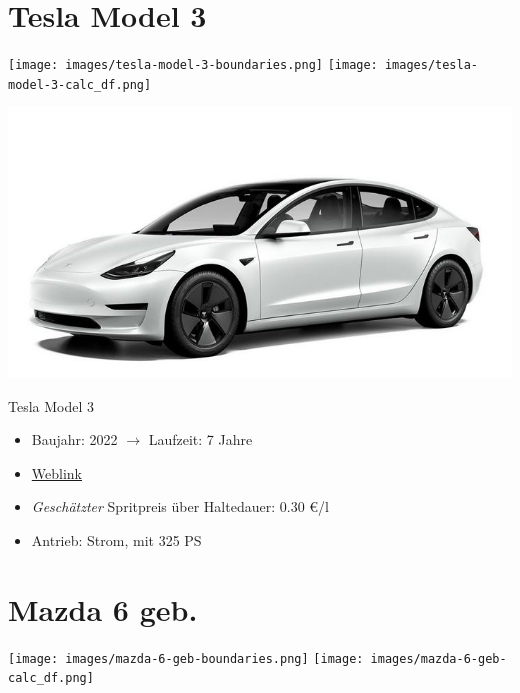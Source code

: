 \documentclass[landscape, DIV=99, 14pt]{scrartcl}
\begin{document}
\pagebreak


\twocolumn

\section*{Tesla Model 3}
\begin{center}
\texttt{[image: images/tesla-model-3-boundaries.png]}
\null
\vspace{0.5cm}
\texttt{[image: images/tesla-model-3-calc\_df.png]}
\end{center}

\pagebreak
\null
\vspace{2cm}
\begin{center}
\includegraphics[width=0.9\columnwidth]{cars/tesla-model-3.jpg}

Tesla Model 3
\end{center}

\begin{itemize}
    \item Baujahr: 2022 $\rightarrow$ Laufzeit: 7 Jahre
    \item \href{https://www.tesla.com/de_de/model3/design\#overview}{Weblink}
    \item \emph{Gesch\"atzter} Spritpreis \"uber Haltedauer: 0.30 \euro{}/l
    \item Antrieb: Strom, mit 325 PS
\end{itemize}

\pagebreak


\twocolumn

\section*{Mazda 6 geb.}
\begin{center}
\texttt{[image: images/mazda-6-geb-boundaries.png]}
\null
\vspace{0.5cm}
\texttt{[image: images/mazda-6-geb-calc\_df.png]}
\end{center}
\end{document}
